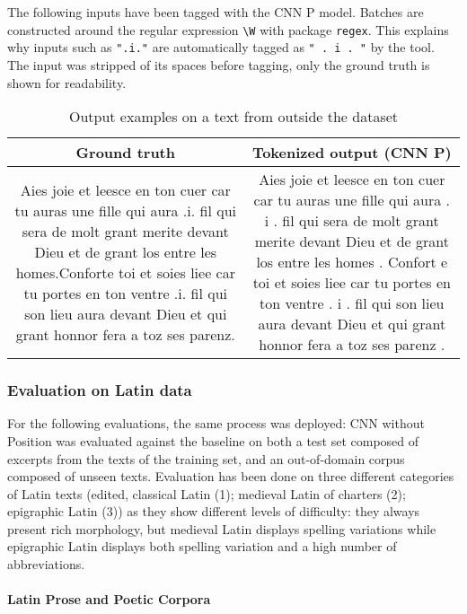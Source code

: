 \documentclass{jdmdh}
\begin{document}
The following inputs have been tagged with the CNN P model. Batches are constructed around the regular expression \texttt{\textbackslash{}W} with package \texttt{regex}. This explains why inputs such as \texttt{".i."} are automatically tagged as \texttt{" . i . "} by the tool. The input was stripped of its spaces before tagging, only the ground truth is shown for readability.

\begin{table}[!ht]
\centering
\begin{tabularx}{\textwidth}{|C|C|}
\hline
\textbf{Ground truth} & \textbf{Tokenized output (CNN P)} \\\hline
Aies joie et leesce en ton cuer car tu auras une fille qui aura .i. fil qui sera de molt grant merite devant Dieu et de grant los entre les homes.Conforte toi et soies liee car tu portes en ton ventre .i. fil qui son lieu aura devant Dieu et qui grant honnor fera a toz ses parenz. & Aies joie et leesce en ton cuer car tu auras une fille qui aura .  i .  fil qui sera de molt grant merite devant Dieu et de grant los entre les homes .  Confort e toi et soies liee car tu portes en ton ventre .  i .  fil qui son lieu aura devant Dieu et qui grant honnor fera a toz ses parenz .
\\\hline
\end{tabularx}
\caption{Output examples on a text from outside the dataset}
\label{tab:example_output}
\end{table}

\subsubsection{Evaluation on Latin data}

For the following evaluations, the same process was deployed: CNN without Position was evaluated against the baseline on both a test set composed of excerpts from the texts of the training set, and an out-of-domain corpus composed of unseen texts. Evaluation has been done on three different categories of Latin texts (edited, classical Latin (1); medieval Latin of charters (2); epigraphic Latin (3)) as they show different levels of difficulty: they always present rich morphology, but medieval Latin displays spelling variations while epigraphic Latin displays both spelling variation and a high number of abbreviations.

\paragraph{Latin Prose and Poetic Corpora}
\end{document}
